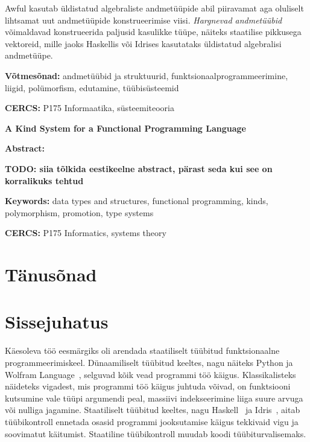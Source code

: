\documentclass[12pt]{article}
\newcommand\peatykk[1]{
  \clearpage
  \section{#1}}
\newcommand\peatykktarn[1]{
  \clearpage
  \section*{#1}
  \addcontentsline{toc}{section}{#1}}
\newcommand\markus[1]{\textcolor{roheline}{\textbf{#1}}}
\begin{document}
  Awful kasutab üldistatud algebraliste andmetüüpide abil piiravamat aga oluliselt lihtsamat uut andmetüüpide konstrueerimise viisi. \textit{Hargnevad andmetüübid} võimaldavad konstrueerida paljusid kasulikke tüüpe, näiteks staatilise pikkusega vektoreid, mille jaoks Haskellis või Idrises kasutataks üldistatud algebralisi andmetüüpe.

  \vspace*{1ex}

  \noindent
  \textbf{Võtmesõnad:} andmetüübid ja struktuurid, funktsionaalprogrammeerimine, liigid, polümorfism, edutamine, tüübisüsteemid

  \vspace*{1ex}

  \noindent
  \textbf{CERCS:} P175 Informaatika, süsteemiteooria

  \vspace*{3ex}

  {
    \noindent
    \textbf{\large A Kind System for a Functional Programming Language}

    \vspace*{1ex}

    \noindent
    \textbf{Abstract:}

    \noindent
    \markus{TODO: siia tõlkida eestikeelne abstract, pärast seda kui see on korralikuks tehtud}

    \vspace*{1ex}

    \noindent
    \textbf{Keywords:} data types and structures, functional programming, kinds, polymorphism, promotion, type systems

    \vspace*{1ex}

    \noindent
    \textbf{CERCS:} P175 Informatics, systems theory

    \vspace*{1ex}}
  \newpage
  \tableofcontents
  \peatykktarn{Tänusõnad}
    
  \peatykk{Sissejuhatus}
    Käesoleva töö eesmärgiks oli arendada staatiliselt tüübitud funktsionaalne programmeerimiskeel. Dünaamiliselt tüübitud keeltes, nagu näiteks Python ja Wolfram Language~\cite{Wol}, selguvad kõik vead programmi töö käigus. Klassikalisteks näideteks vigadest, mis programmi töö käigus juhtuda võivad, on funktsiooni kutsumine vale tüüpi argumendi peal, massiivi indekseerimine liiga suure arvuga või nulliga jagamine. Staatiliselt tüübitud keeltes, nagu Haskell~\cite{Gla} ja Idris~\cite{The_Idr}, aitab tüübikontroll ennetada osasid programmi jooksutamise käigus tekkivaid vigu ja soovimatut käitumist. Staatiline tüübikontroll muudab koodi tüübiturvalisemaks.
\end{document}
